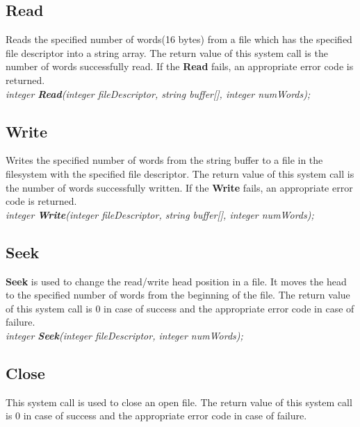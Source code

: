 \documentclass[11pt]{article}
\begin{document}
\subsection{Read}
Reads the specified number of words(16 bytes) from a file which has the specified file descriptor into a string array. The return value of this system call is the number of words successfully read. If the \textbf{Read} fails, an appropriate error code is returned.\\

\textit{integer \textbf{Read}(integer fileDescriptor, string buffer[], integer numWords);}





\subsection{Write}
Writes the specified number of words from the string buffer to a file in the filesystem with the specified file descriptor. The return value of this system call is the number of words successfully written. If the \textbf{Write} fails, an appropriate error code is returned.\\

\textit{integer \textbf{Write}(integer fileDescriptor, string buffer[], integer numWords);}





\subsection{Seek}

\textbf{Seek} is used to change the read/write head position in a file. It moves the head to the specified number of words from the beginning of the file. The return value of this system call is 0 in case of success and the appropriate error code in case of failure.\\

\textit{integer \textbf{Seek}(integer fileDescriptor, integer numWords);}
 
 
 
 
 \subsection{Close}
This system call is used to close an open file. The return value of this system call is 0 in case of success and the appropriate error code in case of failure.\\
\end{document}
